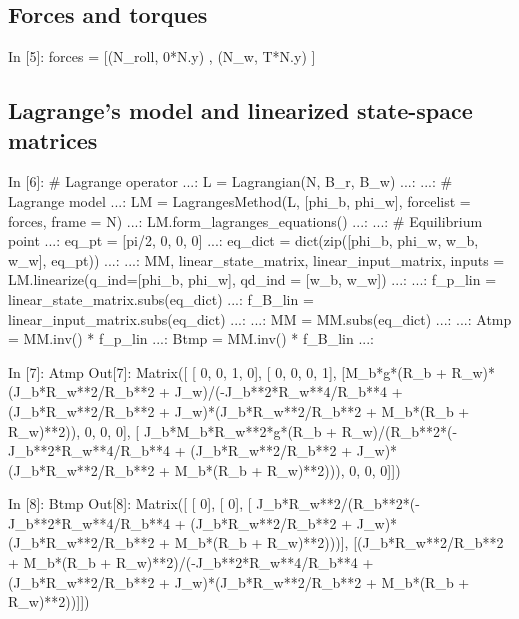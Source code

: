 \subsection{Forces and torques}
\begin{code}
In [5]: forces = [(N_roll, 0*N.y) , (N_w, T*N.y) ]
\end{code}

\subsection{Lagrange's model and linearized state-space matrices}
\begin{code}
In [6]: # Lagrange operator
   ...: L = Lagrangian(N,  B_r,  B_w)
   ...: 
   ...: # Lagrange model
   ...: LM = LagrangesMethod(L, [phi_b, phi_w], forcelist = forces,   frame = N)
   ...: LM.form_lagranges_equations()
   ...: 
   ...: # Equilibrium point
   ...: eq_pt = [pi/2, 0, 0, 0]
   ...: eq_dict = dict(zip([phi_b, phi_w, w_b, w_w], eq_pt))
   ...: 
   ...: MM, linear_state_matrix, linear_input_matrix, inputs = LM.linearize(q_ind=[phi_b, phi_w], qd_ind = [w_b, w_w])
   ...: 
   ...: f_p_lin = linear_state_matrix.subs(eq_dict)
   ...: f_B_lin = linear_input_matrix.subs(eq_dict)
   ...: 
   ...: MM = MM.subs(eq_dict)
   ...: 
   ...: Atmp = MM.inv() * f_p_lin
   ...: Btmp = MM.inv() * f_B_lin
   ...: 

\end{code}

\begin{code}
In [7]: Atmp
Out[7]: 
Matrix([
[                                                                                                                                       0, 0, 1, 0],
[                                                                                                                                       0, 0, 0, 1],
[M_b*g*(R_b + R_w)*(J_b*R_w**2/R_b**2 + J_w)/(-J_b**2*R_w**4/R_b**4 + (J_b*R_w**2/R_b**2 + J_w)*(J_b*R_w**2/R_b**2 + M_b*(R_b + R_w)**2)), 0, 0, 0],
[      J_b*M_b*R_w**2*g*(R_b + R_w)/(R_b**2*(-J_b**2*R_w**4/R_b**4 + (J_b*R_w**2/R_b**2 + J_w)*(J_b*R_w**2/R_b**2 + M_b*(R_b + R_w)**2))), 0, 0, 0]])

In [8]: Btmp
Out[8]: 
Matrix([
[                                                                                                                                    0],
[                                                                                                                                    0],
[                     J_b*R_w**2/(R_b**2*(-J_b**2*R_w**4/R_b**4 + (J_b*R_w**2/R_b**2 + J_w)*(J_b*R_w**2/R_b**2 + M_b*(R_b + R_w)**2)))],
[(J_b*R_w**2/R_b**2 + M_b*(R_b + R_w)**2)/(-J_b**2*R_w**4/R_b**4 + (J_b*R_w**2/R_b**2 + J_w)*(J_b*R_w**2/R_b**2 + M_b*(R_b + R_w)**2))]])
\end{code}

